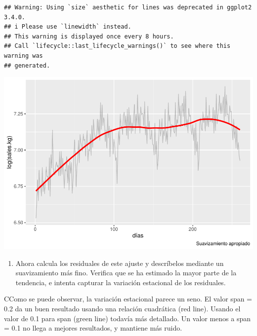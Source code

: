 \documentclass[
]{article}
\providecommand{\tightlist}{%
  \setlength{\itemsep}{0pt}\setlength{\parskip}{0pt}}
\begin{document}
\begin{verbatim}
## Warning: Using `size` aesthetic for lines was deprecated in ggplot2 3.4.0.
## i Please use `linewidth` instead.
## This warning is displayed once every 8 hours.
## Call `lifecycle::last_lifecycle_warnings()` to see where this warning was
## generated.
\end{verbatim}

\includegraphics{tarea-eda-2_files/figure-latex/unnamed-chunk-4-1.pdf}

\begin{enumerate}
\def\labelenumi{\arabic{enumi}.}
\setcounter{enumi}{2}
\tightlist
\item
  Ahora calcula los residuales de este ajuste y descríbelos mediante un
  suavizamiento más fino. Verifica que se ha estimado la mayor parte de
  la tendencia, e intenta capturar la variación estacional de los
  residuales.
\end{enumerate}

CComo se puede observar, la variación estacional parece un seno. El
valor span = 0.2 da un buen resultado usando una relación cuadrática
(red line). Usando el valor de 0.1 para span (green line) todavía más
detallado. Un valor menos a span = 0.1 no llega a mejores resultados, y
mantiene más ruido.
\end{document}

